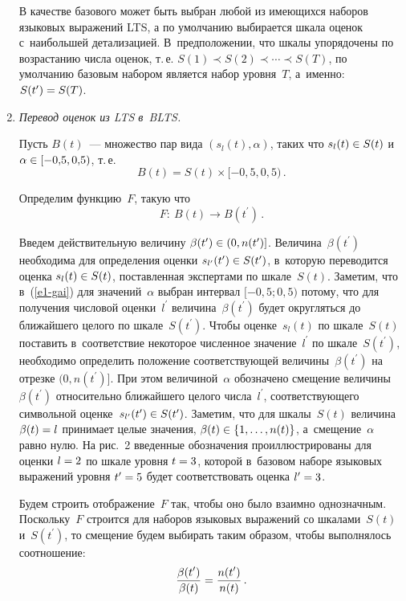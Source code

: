 \begin{multicols}{2}
\begin{enumerate}[1.]
  В качестве базового может быть выбран любой из имеющихся наборов 
языковых выражений LTS, а по умолчанию выбирается шкала оценок 
с~наибольшей детализацией. В~предположении, что шкалы упорядочены по 
возрастанию числа оценок, т.\,е. $S(1)\prec S(2)\prec \cdots \prec S(T)$, по 
умолчанию базовым набором является набор уровня~$T$, а~именно: 
$S(t^\prime)\hm= S(T)$.
\item \textit{Перевод оценок из LTS в~BLTS. }

  Пусть $B(t)$~--- множество пар вида 
  $(s_l(t),\alpha)$, таких что $s_l(t)\hm\in 
S(t)$ и~$\alpha \hm\in [-0{,}5, 0{,}5)$, т.\,е.
     \begin{equation}
     B(t)=S(t)\times [-0{,}5, 0{,}5)\,.
     \label{e1-gai}
     \end{equation}
  
  Определим функцию~$F$, такую что
  \begin{equation*}
  F:\ B(t)\to B\left( t^\prime\right)\,.
  \end{equation*}
  
  Введем действительную величину $\beta(t^\prime)\hm\in \left( 0, 
n(t^\prime)\right]$. Величина~$\beta(t^\prime)$ необходима для определения 
оценки $s_{l^\prime}(t^\prime)\hm\in S(t^\prime)$, в~которую переводится оценка 
$s_l(t)\hm\in S(t)$, поставленная экспертами по шкале~$S(t)$. Заметим, что 
в~(\ref{e1-gai}) для значений~$\alpha$ выбран интервал $[-0{,}5; 0{,}5)$ 
потому, что для получения числовой оценки~$l^\prime$ 
величина~$\beta(t^\prime)$ будет округляться до ближайшего целого по 
шкале~$S(t^\prime)$. Чтобы оценке~$s_l(t)$ по шкале~$S(t)$ поставить 
в~соответствие некоторое численное значение~$l^\prime$ по 
шкале~$S(t^\prime)$, необходимо определить положение со\-от\-вет\-ст\-ву\-ющей 
величины~$\beta(t^\prime)$ на отрезке $(0,n(t^\prime)]$. При этом 
величиной~$\alpha$ обозначено смещение величины~$\beta(t^\prime)$ 
относительно ближайшего целого числа~$l^\prime$, соответствующего 
символьной оценке~$s_{l^\prime}(t^\prime)\hm\in S(t^\prime)$. Заметим, что для 
шкалы~$S(t)$ величина $\beta(t)\hm= l$ принимает целые значения, 
$\beta(t)\hm\in \{1,\ldots, n(t)\}$, а~смещение~$\alpha$ равно нулю. На рис.~2 
введенные обозначения про\-ил\-люст\-ри\-ро\-ва\-ны для оценки $l\hm=2$ по шкале 
уровня $t\hm=3$, которой в~базовом наборе языковых выражений уровня 
$t^\prime\hm= 5$ будет соответствовать оценка $l^\prime\hm=3$.
   


  Будем строить отображение~$F$ так, чтобы оно было взаимно однозначным. 
Поскольку~$F$ строится для наборов языковых выражений со шкалами~$S(t)$ 
и~$S(t^\prime)$, то смещение будем выбирать таким образом, чтобы 
выполнялось соотношение:
  \begin{equation}
  \displaystyle\frac{\displaystyle \beta(t^\prime)\mathstrut}{\displaystyle \beta(t)\mathstrut}=\displaystyle\frac{\displaystyle n(t^\prime)\mathstrut}{\displaystyle n(t)\mathstrut}\,.
  \label{e3-gai}
  \end{equation}
  

\end{enumerate}
\end{multicols}

